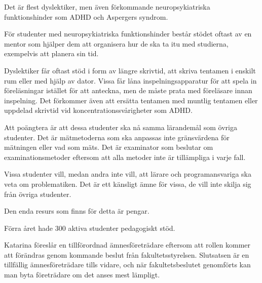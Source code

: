 \documentclass[a4paper,protocol]{miunprot}
\begin{document}
Det är flest dyslektiker, men även förkommande neuropsykiatriska 
funktionshinder som ADHD och Aspergers syndrom.

För studenter med neuropsykiatriska funktionshinder består stödet oftast av en 
mentor som hjälper dem att organisera hur de ska ta itu med studierna, 
exempelvis att planera sin tid.

Dyslektiker får oftast stöd i form av längre skrivtid, att skriva tentamen 
i enskilt rum eller med hjälp av dator.
Vissa får låna inspelningsapparatur för att spela in föreläsningar istället för 
att anteckna, men de måste prata med föreläsare innan inspelning.
Det förkommer även att ersätta tentamen med muntlig tentamen eller uppdelad 
skrivtid vid koncentrationssvårigheter som ADHD.

Att poängtera är att dessa studenter ska nå samma lärandemål som övriga 
studenter.
Det är mätmetoderna som ska anpassas inte gränsvärdena för mätningen eller vad 
som mäts.
Det är examinator som beslutar om examinationsmetoder eftersom att alla metoder 
inte är tillämpliga i varje fall.

Vissa studenter vill, medan andra inte vill, att lärare och programansvariga 
ska veta om problematiken.
Det är ett känsligt ämne för vissa, de vill inte skilja sig från övriga 
studenter.

Den enda resurs som finns för detta är pengar.

Förra året hade 300 aktiva studenter pedagogiskt stöd.


\other
{}
\noindent
Katarina föreslår en tillförordnad ämnesföreträdare eftersom att rollen kommer 
att förändras genom kommande beslut från fakultetsstyrelsen.
Slutsatsen är en tillfällig ämnesföreträdare tills vidare, och när 
fakultetsbeslutet genomförts kan man byta företrädare om det anses mest 
lämpligt.


\makenextmeeting
\end{document}

